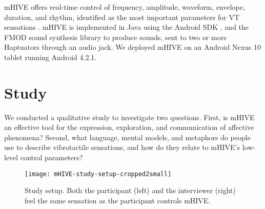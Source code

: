 mHIVE offers real-time control of frequency, amplitude, waveform, envelope, duration, and rhythm, identified as the most important parameters for VT sensations \cite{Gunther2002,Brown2006a,Brown2006,Brewster2004, Rovan2000}.
mHIVE is implemented in Java using the Android SDK \cite{AndroidOpenSourceProject2012}, and the FMOD sound synthesis library \cite{fmod2013} to produce sounds, sent to two or more Haptuators through an audio jack.
We deployed mHIVE on an Android Nexus 10 tablet running Android 4.2.1.




%
% 
\section{Study}

%
% 
We conducted a qualitative study to investigate two questions.
First, is mHIVE an effective tool for the expression, exploration, and communication of affective phenomena?
Second, what language, mental models, and metaphors do people use to describe vibrotactile sensations, and how do they relate to mHIVE's low-level control parameters?

\begin{figure}[Htb]
	\centering
	   \texttt{[image: mHIVE-study-setup-cropped2small]} 
	   \caption{
	   Study setup. Both the participant (left) and the interviewer (right) feel the same sensation as the participant controls mHIVE.
}
	   \label{fig:hapticinstrument:StudySetup}
\end{figure}

